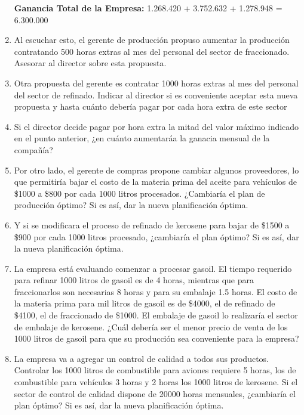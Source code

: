 \documentclass[10pt,a4paper]{article}
\begin{document}
\begin{enumerate}
    \vspace{0.5em}

    \textbf{Ganancia Total de la Empresa: } 1.268.420 + 3.752.632 + 1.278.948 = 6.300.000

    \item Al escuchar esto, el gerente de producción propuso aumentar la producción contratando 500 horas extras al
    mes del personal del sector de fraccionado. Asesorar al director sobre esta propuesta.

    \item Otra propuesta del gerente es contratar 1000 horas extras al mes del personal del sector de refinado. Indicar
    al director si es conveniente aceptar esta nueva propuesta y hasta cuánto debería pagar por cada hora extra
    de este sector

    \item Si el director decide pagar por hora extra la mitad del valor máximo indicado en el punto anterior, ¿en cuánto
    aumentaráa la ganacia mensual de la compañía?


    \item Por otro lado, el gerente de compras propone cambiar algunos proveedores, lo que permitiría bajar el costo
    de la materia prima del aceite para vehículos de \$1000 a \$800 por cada 1000 litros procesados. ¿Cambiaría el
    plan de producción óptimo? Si es así, dar la nueva planificación óptima.

    \item Y si se modificara el proceso de refinado de kerosene para bajar de \$1500 a \$900 por cada 1000 litros procesado,
    ¿cambiaría el plan óptimo? Si es así, dar la nueva planificación óptima.
    
    \item La empresa está evaluando comenzar a procesar gasoil. El tiempo requerido para refinar 1000 litros de gasoil
    es de 4 horas, mientras que para fraccionarlos son necesarias 8 horas y para su embalaje 1.5 horas. El costo
    de la materia prima para mil litros de gasoil es de \$4000, el de refinado de \$4100, el de fraccionado de \$1000.
    El embalaje de gasoil lo realizaría el sector de embalaje de kerosene. ¿Cuál debería ser el menor precio de
    venta de los 1000 litros de gasoil para que su producción sea conveniente para la empresa?
    
    \item La empresa va a agregar un control de calidad a todos sus productos. Controlar los 1000 litros de combustible
    para aviones requiere 5 horas, los de combustible para vehículos 3 horas y 2 horas los 1000 litros de kerosene.
    Si el sector de control de calidad dispone de 20000 horas mensuales, ¿cambiaría el plan óptimo? Si es así, dar
    la nueva planificación óptima.

\end{enumerate}

\clearpage
\end{document}
